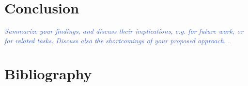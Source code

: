 \documentclass[11pt,letterpaper]{article}
\newcommand{\blue}[1]{\textcolor{RoyalBlue}{#1}}
\newcommand{\instructions}[1]{\blue{\textit{#1}}}
\begin{document}
\section{Conclusion}
\instructions{Summarize your findings, and discuss their implications, e.g. for future work, or for related tasks. Discuss also the shortcomings of your proposed approach. }. 


\section*{Bibliography}
{}

\end{document}
